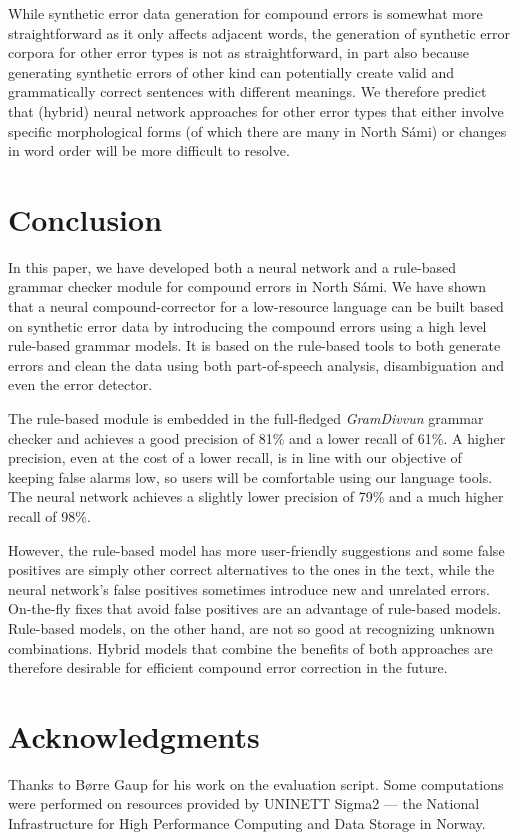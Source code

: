 \documentclass[postprint]{flammie}
\begin{document}
While synthetic error data generation for compound errors is somewhat more
straightforward as it only affects adjacent words, the generation of synthetic
error corpora for other error types is not as straightforward, in part also
because generating synthetic errors of other kind can potentially create valid
and grammatically correct sentences with different meanings.  We therefore
predict that (hybrid) neural network approaches for other error types that
either involve specific morphological forms (of which there are many in North
Sámi) or changes in word order will be more difficult to resolve.





\section{Conclusion}




In this paper, we have developed both a neural network and a rule-based grammar
checker module for compound errors in North Sámi.  We have shown that a neural
compound-corrector for a low-resource language can be built based on synthetic
error data by introducing the compound errors using a high level rule-based
grammar models.  It is based on the rule-based tools to both generate errors and
clean the data using both part-of-speech analysis, disambiguation and even the
error detector.

The rule-based module is embedded in the full-fledged \textit{GramDivvun}
grammar checker and achieves a good precision of 81\% and a lower recall of
61\%. A higher precision, even at  the cost of a lower recall, is in line with
our objective of keeping false alarms low, so users will be comfortable using
our language tools.  The neural network achieves a slightly lower precision of
79\% and a much higher recall of 98\%.


However, the rule-based model has more user-friendly suggestions and some false
positives are simply other correct alternatives to the ones in the text, while
the neural network's false positives sometimes introduce new and unrelated
errors.  On-the-fly fixes that avoid false positives are an advantage of
rule-based models.  Rule-based models, on the other hand, are not so good at
recognizing unknown combinations.  Hybrid models that combine the benefits of
both approaches are therefore desirable for efficient compound error correction
in the future.



\section*{Acknowledgments}

Thanks to Børre Gaup for his work on the evaluation script.  Some computations
were performed on resources provided by UNINETT Sigma2 --- the National
Infrastructure for High Performance Computing and  Data Storage in Norway.



\end{document}
